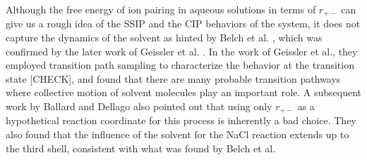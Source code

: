 \begin{spacing}{2.0}
    Although the free energy of ion pairing in aqueous solutions in terms of $r_{+-}$ can give us a rough idea of the SSIP and the CIP behaviors 
    of the system, it does not capture the dynamics of the solvent as hinted by Belch et al. \cite{P-JACS-1986-v108-Belch}, which was confirmed 
    by the later work of Geissler et al. \cite{P-JPhysChemB-1999-v103-Geissler}. In the work of Geissler et al., they employed transition path 
    sampling to characterize the behavior at the transition state [CHECK], and found that there are many probable transition pathways where 
    collective motion of solvent molecules play an important role. A subsequent work by Ballard and Dellago also pointed out that using only 
    $r_{+-}$ as a hypothetical reaction coordinate for this process is inherently a bad choice. \cite{P-JPhysChemB-2012-v116-Ballard} They also 
    found that the influence of the solvent for the NaCl reaction extends up to the third shell, consistent with what was found by Belch et al. 
    \cite{P-JACS-1986-v108-Belch}

\end{spacing}
